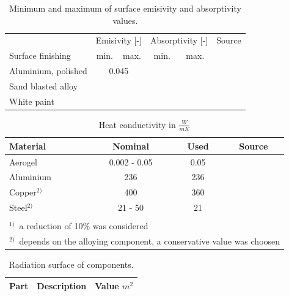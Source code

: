 \begin{table}[htb]
	\centering
	\begin{tabular}{lccccc}
		\hline
		& \multicolumn{2}{l}{Emisivity [-]} & \multicolumn{2}{l}{Absorptivity [-]}& Source  \\ 
		Surface finishing	&	min. & max. 	&	min. & max.  & \\\hline
		Aluminium, polished & \multicolumn{2}{c}{0.045} & &  & \\
		Sand blasted alloy & & & & & \\
		White paint & & & & & \\
	\end{tabular}
	\caption{Minimum and maximum of surface emisivity and absorptivity values.}
	\label{tab:tcs_surface}
\end{table}




\begin{table}[htb]
	\centering
	\begin{tabular}{lccc}
		\hline
		Material & Nominal & Used & Source \\ \hline
		Aerogel & 0.002 - 0.05 & 0.05 & \\
		Aluminium & 236 & 236 & \\
		Copper$^{2)}$ &  400 & 360 & \\
		Steel$^{2)}$ & 21 - 50 & 21 & \\ \hline
		& & & \\
		\multicolumn{4}{l}{\small{$^{1)}$\ a reduction of 10\% was considered}}\\
		\multicolumn{4}{l}{\small{$^{2)}$\ depends on the alloying component, a conservative value was choosen }}\\
	\end{tabular}
	\caption{Heat conductivity in $\frac{W}{mK}$}
	\label{tab:tcs_conduct2}
\end{table}

\begin{table}[htb]
	\centering
	\begin{tabular}{lcc}
		\hline
		Part & Description & Value $m^2$  \\ \hline
		
	\end{tabular}
	\caption{Radiation surface of components.}
	\label{tab:tcs_surf}
\end{table}

